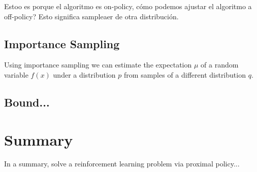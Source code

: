 Estoo es porque el algoritmo es on-policy, cómo podemos ajustar el
algoritmo a off-policy? Esto significa sampleaer de otra distribución.


\subsection{Importance Sampling}


Using importance sampling we can estimate the expectation $\mu$ of a random
variable $f(x)$ under a distribution $p$ from samples of a different 
distribution $q$. 


\subsection{Bound...}

\section{Summary}

In a summary, solve a reinforcement learning problem
via proximal policy...